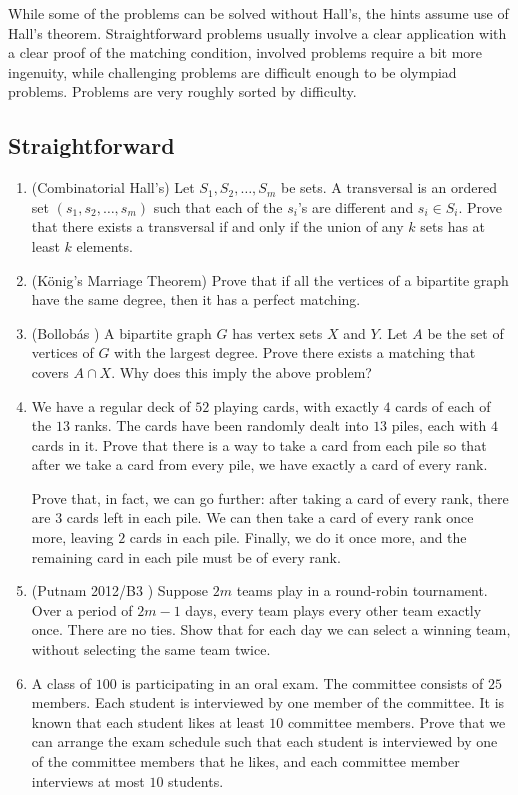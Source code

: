 \documentclass[11pt,paper=letter]{scrartcl}
\begin{document}
While some of the problems can be solved without Hall's, the hints assume use of Hall's theorem. Straightforward problems usually involve a clear application with a clear proof of the matching condition, involved problems require a bit more ingenuity, while challenging problems are difficult enough to be olympiad problems. Problems are very roughly sorted by difficulty.

\subsection{Straightforward}

\begin{enumerate}

\item (Combinatorial Hall's) Let $S_1, S_2, \ldots, S_m$ be sets. A transversal is an ordered set $(s_1, s_2, \ldots, s_m)$ such that each of the $s_i$'s are different and $s_i \in S_i$. Prove that there exists a transversal if and only if the union of any $k$ sets has at least $k$ elements.

\item (K\"onig's Marriage Theorem) Prove that if all the vertices of a bipartite graph have the same degree, then it has a perfect matching.

\item (Bollob\'as \cite{bollobas}) A bipartite graph $G$ has vertex sets $X$ and $Y$. Let $A$ be the set of vertices of $G$ with the largest degree. Prove there exists a matching that covers $A \cap X$. Why does this imply the above problem?

\item We have a regular deck of $52$ playing cards, with exactly $4$ cards of each of the $13$ ranks. The cards have been randomly dealt into $13$ piles, each with $4$ cards in it. Prove that there is a way to take a card from each pile so that after we take a card from every pile, we have exactly a card of every rank.

Prove that, in fact, we can go further: after taking a card of every rank, there are $3$ cards left in each pile. We can then take a card of every rank once more, leaving $2$ cards in each pile. Finally, we do it once more, and the remaining card in each pile must be of every rank.

\item (Putnam 2012/B3 \cite{putnam}) Suppose $2m$ teams play in a round-robin tournament. Over a period of $2m-1$ days, every team plays every other team exactly once. There are no ties. Show that for each day we can select a winning team, without selecting the same team twice.

\item A class of $100$ is participating in an oral exam. The committee consists of $25$ members. Each student is interviewed by one member of the committee. It is known that each student likes at least $10$ committee members. Prove that we can arrange the exam schedule such that each student is interviewed by one of the committee members that he likes, and each committee member interviews at most $10$ students.

\end{enumerate}
\end{document}
